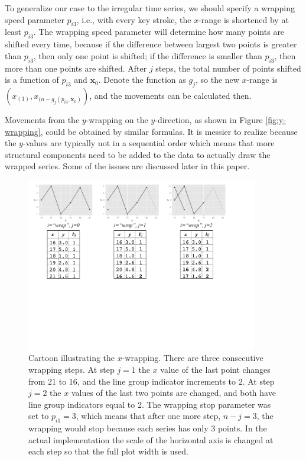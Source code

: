 \documentclass[12pt]{article}
\begin{document}
To generalize our case to the irregular time series, we
should specify a wrapping speed parameter $p_{i3}$, i.e.,
with every key stroke, the $x$-range is shortened by at
least $p_{i3}$. The wrapping speed parameter will determine
how many points are shifted every time, because if the
difference between largest two points is greater than
$p_{i3}$, then only one point is shifted; if the difference
is smaller than $p_{i3}$, then more than one points are
shifted. After $j$ steps, the total number of points
shifted is a function of $p_{i3}$ and $\mathbf{x}_0$.
Denote the function as $g_j$, so the new $x$-range is
$(x_{(1)},x_{(n-g_j(p_{i3},\mathbf{x}_0)})$, and the
movements can be calculated then.

Movements from the $y$-wrapping on the $y$-direction,
as shown in Figure \ref{fig:y-wrapping}, could be obtained
by similar formulas. It is messier to realize because the
$y$-values are typically not in a sequential order which
means that more structural components need to be added to
the data to actually draw the wrapped series. Some of the
issues are discussed later in this paper.

\begin{center}
\begin{figure}[htp]
\centerline{\includegraphics[width=0.9\textwidth]{graph/wrap-example.pdf}}
\caption{\label{fig:x-wrapping-algorithm} Cartoon illustrating
the $x$-wrapping. There are three consecutive wrapping
steps. At step $j=1$ the $x$ value of the last point changes
from 21 to 16, and the line group indicator increments to 2.
At step $j=2$ the $x$ values of the last two points are changed,
and both have line group indicators equal to 2.  The wrapping
stop parameter was set to $p_{i1}=3$, which means that after
one more step, $n-j=3$, the wrapping would stop because each
series has only 3 points. In the actual implementation the
scale of the horizontal axis is changed at each step so that
the full plot width is used.}
\end{figure}
\end{center}
\end{document}
